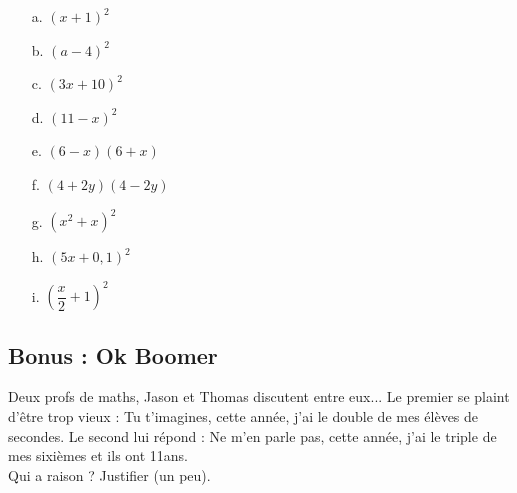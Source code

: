\documentclass[11pt]{article}
\newcommand{\Pointilles}[1][3]{%
  \multido{}{#1}{\makebox[\linewidth]{\dotfill}\\[\parskip]
}}
\begin{document}
\begin{multicols}{3}


\begin{enumerate}
    \item[a.] $(x+1)^2$ 
    \item[b.] $(a-4)^2$
    \item[c.] $(3x + 10)^2$
    \item[d.] $(11 - x)^2$
    \item[e.] $(6 - x)(6 + x)$   
    \item[f.] $(4 + 2y)(4 - 2y)$
    \item[g.] $(x^2 + x)^2$
    \item[h.] $(5x + 0,1)^2$
    \item[i.] $(\dfrac{x}{2} + 1)^2$ 
\end{enumerate}

\end{multicols}

\Pointilles[18] 

\subsection*{Bonus : Ok Boomer}
Deux profs de maths, Jason et Thomas discutent entre eux... Le premier se plaint d'être trop vieux : \og Tu t'imagines, cette année, j'ai le double de mes élèves de secondes. \fg Le second lui répond : \og Ne m'en parle pas, cette année, j'ai le triple de mes sixièmes et ils ont 11ans. \fg \\
Qui a raison ? Justifier (un peu).

\Pointilles[3] 
\end{document}
